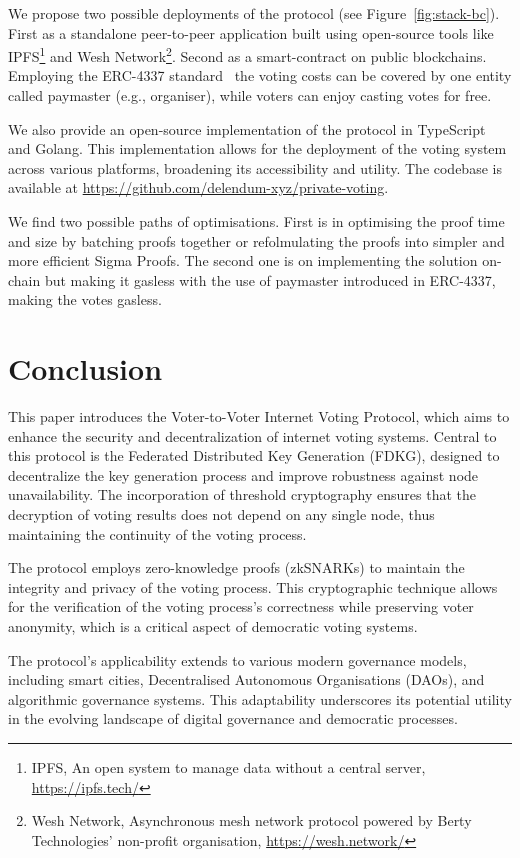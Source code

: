 \documentclass[runningheads]{llncs}
\begin{document}
We propose two possible deployments of the protocol (see Figure~\ref{fig:stack-bc}). First as a standalone peer-to-peer application built using open-source tools like IPFS\footnote{IPFS, An open system to manage data without a central server, \url{https://ipfs.tech/}} and Wesh Network\footnote{Wesh Network, Asynchronous mesh network protocol powered by Berty Technologies’ non-profit organisation, \url{https://wesh.network/}}. Second as a smart-contract on public blockchains. Employing the ERC-4337 standard~\cite{ERC4337AccountAbstraction} the voting costs can be covered by one entity called paymaster (e.g., organiser), while voters can enjoy casting votes for free.

We also provide an open-source implementation of the protocol in TypeScript and Golang. This implementation allows for the deployment of the voting system across various platforms, broadening its accessibility and utility. The codebase is available at \url{https://github.com/delendum-xyz/private-voting}.

We find two possible paths of optimisations. First is in optimising the proof time and size by batching proofs together or refolmulating the proofs into simpler and more efficient Sigma Proofs. 
The second one is on implementing the solution on-chain but making it gasless with the use of paymaster introduced in ERC-4337, making the votes gasless.

\section{Conclusion}

This paper introduces the Voter-to-Voter Internet Voting Protocol, which aims to enhance the security and decentralization of internet voting systems. Central to this protocol is the Federated Distributed Key Generation (FDKG), designed to decentralize the key generation process and improve robustness against node unavailability. The incorporation of threshold cryptography ensures that the decryption of voting results does not depend on any single node, thus maintaining the continuity of the voting process.

The protocol employs zero-knowledge proofs (zkSNARKs) to maintain the integrity and privacy of the voting process. This cryptographic technique allows for the verification of the voting process's correctness while preserving voter anonymity, which is a critical aspect of democratic voting systems.

The protocol's applicability extends to various modern governance models, including smart cities, Decentralised Autonomous Organisations (DAOs), and algorithmic governance systems. This adaptability underscores its potential utility in the evolving landscape of digital governance and democratic processes.
\end{document}
